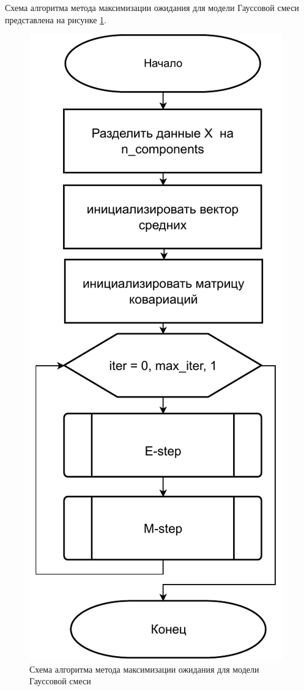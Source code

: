 Схема алгоритма метода максимизации ожидания для модели Гауссовой смеси представлена на рисунке \ref{EM}.

\begin{figure}[H]
	\centering
	\includegraphics[scale=1]{img/EM.pdf}
	\caption{Схема алгоритма метода максимизации ожидания для модели Гауссовой смеси}
	\label{EM}
\end{figure}

